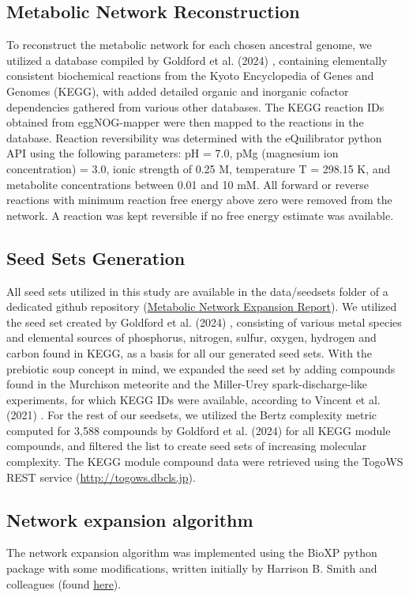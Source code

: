 \subsection*{Metabolic Network Reconstruction}


To reconstruct the metabolic network for each chosen ancestral genome, we utilized a database compiled by Goldford et al. (2024) \cite{goldford2024}, containing elementally consistent biochemical reactions from the Kyoto Encyclopedia of Genes and Genomes (KEGG), with added detailed organic and inorganic cofactor dependencies gathered from various other databases. The KEGG reaction IDs obtained from eggNOG-mapper were then mapped to the reactions in the database. Reaction reversibility was determined with the eQuilibrator python API \cite{beber2022} using the following parameters: pH = 7.0, pMg (magnesium ion concentration) = 3.0, ionic strength of 0.25 M, temperature T = 298.15 K, and metabolite concentrations between 0.01 and 10 mM. All forward or reverse reactions with minimum reaction free energy above zero were removed from the network. A reaction was kept reversible if no free energy estimate was available.

\subsection*{Seed Sets Generation}

All seed sets utilized in this study are available in the data/seedsets folder of a dedicated github repository (\href{https://github.com/astrademertzi/metnetexp_report}{Metabolic Network Expansion Report}). We utilized the seed set created by Goldford et al. (2024) \cite{goldford2024}, consisting of various metal species and elemental sources of phosphorus, nitrogen, sulfur, oxygen, hydrogen and carbon found in KEGG, as a basis for all our generated seed sets. With the prebiotic soup concept in mind, we expanded the seed set by adding compounds found in the Murchison meteorite and the Miller-Urey spark-discharge-like experiments, for which KEGG IDs were available, according to Vincent et al. (2021) \cite{vincent2021}. For the rest of our seedsets, we utilized the Bertz complexity metric computed for 3,588 compounds by Goldford et al. (2024) for all KEGG module compounds, and filtered the list to create seed sets of increasing molecular complexity. The KEGG module compound data were retrieved using the TogoWS REST service (\href{http://togows.dbcls.jp}{http://togows.dbcls.jp}).


\subsection*{Network expansion algorithm} 

The network expansion algorithm was implemented using the BioXP python package with some modifications, written initially by Harrison B. Smith and colleagues (found \href{https://github.com/hbsmith/BioXP}{here}). 